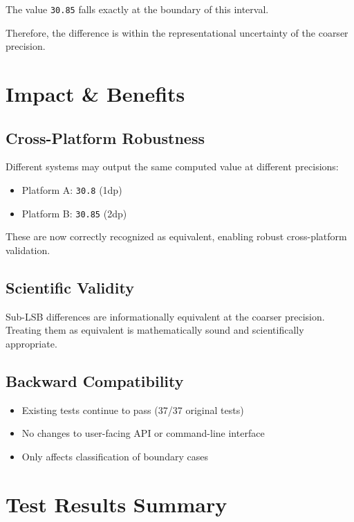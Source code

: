 \documentclass[11pt]{article}
\begin{document}
The value \texttt{30.85} falls exactly at the boundary of this interval.

Therefore, the difference is within the representational uncertainty of the coarser precision.

\section{Impact \& Benefits}

\subsection{Cross-Platform Robustness}

Different systems may output the same computed value at different precisions:

\begin{itemize}
    \item Platform A: \texttt{30.8} (1dp)
    \item Platform B: \texttt{30.85} (2dp)
\end{itemize}

These are now correctly recognized as equivalent, enabling robust cross-platform validation.

\subsection{Scientific Validity}

Sub-LSB differences are informationally equivalent at the coarser precision. Treating them as equivalent is mathematically sound and scientifically appropriate.

\subsection{Backward Compatibility}

\begin{itemize}
    \item Existing tests continue to pass (37/37 original tests)
    \item No changes to user-facing API or command-line interface
    \item Only affects classification of boundary cases
\end{itemize}

\section{Test Results Summary}
\end{document}
